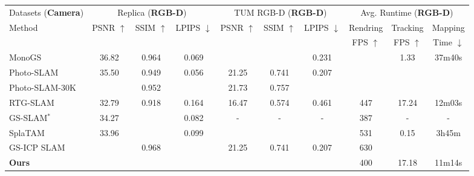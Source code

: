 \begin{table}
\footnotesize
  \centering
   \setlength\tabcolsep{10pt} 
  \begin{tabular}{@{}l|ccc|ccc|ccc} %
    \hline   
   Datasets ({\bf Camera}) & \multicolumn{3}{c|}{Replica ({\bf RGB-D})} & \multicolumn{3}{c|}{TUM RGB-D  ({\bf RGB-D})}  & \multicolumn{3}{c}{Avg. Runtime  ({\bf RGB-D})}\\
    \multirow{2}{*}{Method} &\multirow{2}{*}{PSNR $\uparrow$} &\multirow{2}{*}{SSIM $\uparrow$} &\multirow{2}{*}{LPIPS $\downarrow$} &\multirow{2}{*}{PSNR $\uparrow$} &\multirow{2}{*}{SSIM $\uparrow$} &\multirow{2}{*}{LPIPS $\downarrow$} & Rendring & Tracking& Mapping \\
    & & & & & &  & FPS $\uparrow$ & FPS $\uparrow$ & Time $\downarrow$ \\
    \hline       
       MonoGS \cite{MonoGS2024} & 36.82 & 0.964 & 0.069  & \cellcolor{lightorange}{24.11} &	\cellcolor{lightorange}{0.800}&	0.231  &	\cellcolor{lightyellow}{706} &	1.33  &	37m40s\\
       Photo-SLAM \cite{Photo-SLAM2024}  & 35.50 & 0.949 & 0.056 &	21.25 &	0.741  & 0.207 	 &	\cellcolor{lightred}{\bf 1562} &	\cellcolor{lightyellow}{30.30}  &	\cellcolor{lightred}{\bf 1m20s}\\
       Photo-SLAM-30K & \cellcolor{lightyellow}{36.94}  & 0.952 & \cellcolor{lightorange}{0.040}  & 21.73 &0.757 &\cellcolor{lightyellow}{0.186}&	\cellcolor{lightorange}{1439} &	\cellcolor{lightred}{\bf 30.87}  &	\cellcolor{lightyellow}{6m32s}\\
       RTG-SLAM \cite{RTG-SLAM2024} & 32.79 & 0.918 & 0.164  &	16.47 &	0.574 &	0.461&	447 &	17.24  &	12m03s\\
       GS-SLAM$^*$ \cite{GS-SLAM2024} & 34.27 & \cellcolor{lightred}{\bf 0.975} & 0.082  & - & - & - &	387 &	-  &	-\\
       SplaTAM \cite{SplaTAM2024} & 33.96 & \cellcolor{lightyellow}{0.969} & 0.099 & \cellcolor{lightyellow}{23.60} & \cellcolor{lightyellow}{0.783} & \cellcolor{lightorange}{0.164}  &	531 &	0.15  &	3h45m\\
       GS-ICP SLAM \cite{GS-ICPSLAM2024} & \cellcolor{lightorange}{37.14} & 0.968 & \cellcolor{lightyellow}{0.045}& 21.25 & 0.741 & 0.207 &	630 &	\cellcolor{lightorange}{30.32}  &	\cellcolor{lightorange}{1m32s}\\
       \hline
       {\bf Ours} &\cellcolor{lightred}{\bf 39.14} & \cellcolor{lightorange}{0.974} & \cellcolor{lightred}{\bf 0.023}  &	\cellcolor{lightred}{\bf 25.95} &	\cellcolor{lightred}{\bf 0.853} & \cellcolor{lightred}{\bf 0.160}   &	400 &	17.18   &	11m14s\\

\end{tabular}
\end{table}
